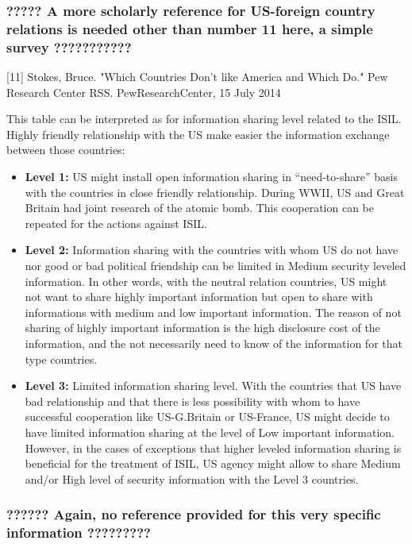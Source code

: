 \documentclass{report}
\begin{document}
\subsubsection{?????  A more scholarly reference for US-foreign country relations is needed other than number 11 here, a simple survey    ???????????}

[11]  Stokes, Bruce. "Which Countries Don't like America and Which Do." Pew Research Center RSS. PewResearchCenter, 15 July 2014

This table can be interpreted as for information sharing level related to the ISIL. Highly friendly relationship with the US make easier the information exchange between those countries: 

\begin{itemize}
  \item \textbf{Level 1:} US might install open information sharing in \enquote{need-to-share} basis with the countries in close friendly relationship. During WWII, US and Great Britain had joint research of the atomic bomb. This cooperation can be repeated for the actions against ISIL.
  \item \textbf{Level 2:} Information sharing with the countries with whom US do not have nor good or bad political friendship can be limited in Medium security leveled information. In other words, with the neutral relation countries, US might not want to share highly important information but open to share with informations with medium and low important information. The reason of not sharing of highly important information is the high disclosure cost of the information, and the not necessarily need to know of the information for that type countries. 
  \item \textbf{Level 3:} Limited information sharing level. With the countries that US have bad relationship and that there is less possibility with whom to have successful cooperation like US-G.Britain or US-France, US might decide to have limited information sharing at the level of Low important information. However, in the cases of exceptions that higher leveled information sharing is beneficial for the treatment of ISIL, US agency might allow to share Medium and/or High level of security information with the Level 3 countries.
\end{itemize}


\subsubsection{??????  Again, no reference provided for this very specific information     ?????????}
\end{document}
